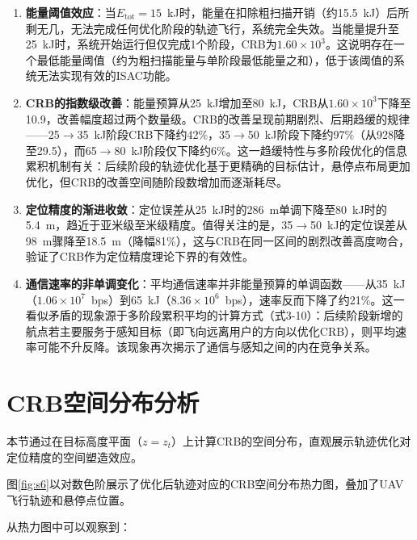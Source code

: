 \begin{enumerate}
\item \textbf{能量阈值效应}：当$E_{\text{tot}}=15$~kJ时，能量在扣除粗扫描开销（约15.5~kJ）后所剩无几，无法完成任何优化阶段的轨迹飞行，系统完全失效。当能量提升至25~kJ时，系统开始运行但仅完成1个阶段，CRB为$1.60\times10^{3}$。这说明存在一个最低能量阈值（约为粗扫描能量与单阶段最低能量之和），低于该阈值的系统无法实现有效的ISAC功能。

\item \textbf{CRB的指数级改善}：能量预算从25~kJ增加至80~kJ，CRB从$1.60\times10^{3}$下降至10.9，改善幅度超过两个数量级。CRB的改善呈现前期剧烈、后期趋缓的规律——25$\rightarrow$35~kJ阶段CRB下降约42\%，35$\rightarrow$50~kJ阶段下降约97\%（从928降至29.5），而65$\rightarrow$80~kJ阶段仅下降约6\%。这一趋缓特性与多阶段优化的信息累积机制有关：后续阶段的轨迹优化基于更精确的目标估计，悬停点布局更加优化，但CRB的改善空间随阶段数增加而逐渐耗尽。

\item \textbf{定位精度的渐进收敛}：定位误差从25~kJ时的286~m单调下降至80~kJ时的5.4~m，趋近于亚米级至米级精度。值得关注的是，35$\rightarrow$50~kJ的定位误差从98~m骤降至18.5~m（降幅81\%），这与CRB在同一区间的剧烈改善高度吻合，验证了CRB作为定位精度理论下界的有效性。

\item \textbf{通信速率的非单调变化}：平均通信速率并非能量预算的单调函数——从35~kJ（$1.06\times10^{7}$~bps）到65~kJ（$8.36\times10^{6}$~bps），速率反而下降了约21\%。这一看似矛盾的现象源于多阶段累积平均的计算方式（式3-10）：后续阶段新增的航点若主要服务于感知目标（即飞向远离用户的方向以优化CRB），则平均速率可能不升反降。该现象再次揭示了通信与感知之间的内在竞争关系。
\end{enumerate}

\section{CRB空间分布分析}

本节通过在目标高度平面（$z=z_t$）上计算CRB的空间分布，直观展示轨迹优化对定位精度的空间塑造效应。

图\ref{fig:s6}以对数色阶展示了优化后轨迹对应的CRB空间分布热力图，叠加了UAV飞行轨迹和悬停点位置。

从热力图中可以观察到：

